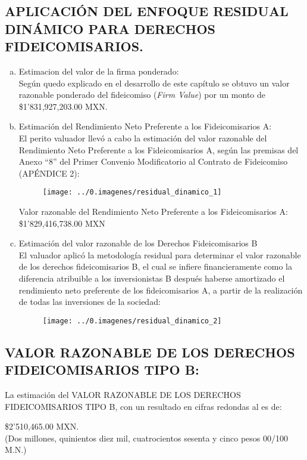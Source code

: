 \subsection{APLICACI\'ON DEL ENFOQUE RESIDUAL DIN\'AMICO PARA DERECHOS FIDEICOMISARIOS. }

\begin{enumerate}[a)]
\item Estimaci\´on del valor de la firma ponderado:\\

Seg\'un quedo explicado en el desarrollo de este cap\'itulo se obtuvo un valor razonable ponderado del fideicomiso (\textit{Firm Value}) por un monto de \$1'831,927,203.00 MXN.

\item Estimaci\'on del Rendimiento Neto Preferente a los Fideicomisarios A:\\

El perito valuador llev\'o a cabo la estimaci\'on del valor razonable del Rendimiento Neto Preferente a los Fideicomisarios A, seg\'un las premisas del Anexo ``8'' del Primer Convenio Modificatorio al Contrato de Fideicomiso \textcolor{terciario}{(AP\'ENDICE 2):}

\begin{figure}[H]
\centering
\texttt{[image: ../0.imagenes/residual\_dinamico\_1]}
\end{figure}

\textbullet  Valor razonable del Rendimiento Neto Preferente a los Fideicomisarios A: \\
\$1'829,416,738.00 MXN

\item Estimaci\'on del valor razonable de los Derechos Fideicomisarios B\\

El valuador aplic\'o la metodolog\'ia residual para determinar el valor razonable de los derechos fideicomisarios B, el cual se infiere financieramente como la diferencia atribuible a los inversionistas B despu\'es haberse amortizado el rendimiento neto preferente de los fideicomisarios A, a partir de la realizaci\'on de todas las inversiones de la sociedad:

\begin{figure}[H]
\centering
\texttt{[image: ../0.imagenes/residual\_dinamico\_2]}
\end{figure}

\end{enumerate}

\subsection{VALOR RAZONABLE DE LOS DERECHOS FIDEICOMISARIOS TIPO B:}

La estimaci\'on del VALOR RAZONABLE DE LOS DERECHOS FIDEICOMISARIOS TIPO B, con un resultado en cifras redondas al \fechaValores es de:

\begin{center}
\$2'510,465.00 MXN.\\
(Dos millones, quinientos diez mil, cuatrocientos sesenta y cinco pesos 00/100 M.N.)
\end{center}

